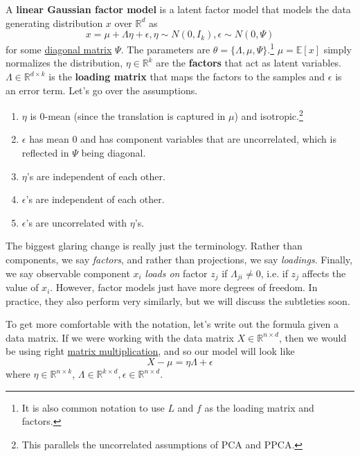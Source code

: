   \begin{definition}
    \label{def:linear-gaussian-factor-model}
 
    A \textbf{linear Gaussian factor model} is a latent factor model that models the data generating distribution $x$ over $\mathbb{R}^d$ as 
    \begin{equation}
      x = \mu + \Lambda \eta + \epsilon, \eta \sim N(0, I_k), \epsilon \sim N(0, \Psi)
    \end{equation}
    for some \hyperref[lin-def:diagonal-matrix]{diagonal matrix} $\Psi$. The parameters are $\theta = \{\Lambda, \mu, \Psi\}$.\footnote{It is also common notation to use $L$ and $f$ as the loading matrix and factors.} $\mu = \mathbb{E}[x]$ simply normalizes the distribution, $\eta \in \mathbb{R}^k$ are the \textbf{factors} that act as latent variables. $\Lambda \in \mathbb{R}^{d \times k}$ is the \textbf{loading matrix} that maps the factors to the samples and $\epsilon$ is an error term. 
    Let's go over the assumptions. 
    \begin{enumerate}
      \item  $\eta$ is $0$-mean (since the translation is captured in $\mu$) and isotropic.\footnote{This parallels the uncorrelated assumptions of PCA and PPCA.}
      \item $\epsilon$ has mean $0$ and has component variables that are uncorrelated, which is reflected in $\Psi$ being diagonal.
      \item $\eta$'s are independent of each other. 
      \item $\epsilon$'s are independent of each other. 
      \item $\epsilon$'s are uncorrelated with $\eta$'s. 
    \end{enumerate}
  \end{definition} 

  The biggest glaring change is really just the terminology. Rather than components, we say \textit{factors}, and rather than projections, we say \textit{loadings}. Finally, we say observable component $x_i$ \textit{loads on} factor $z_j$ if $\Lambda_{ji} \neq 0$, i.e. if $z_j$ affects the value of $x_i$. However, factor models just have more degrees of freedom. In practice, they also perform very similarly, but we will discuss the subtleties soon. 

  To get more comfortable with the notation, let's write out the formula given a data matrix. If we were working with the data matrix $X \in \mathbb{R}^{n \times d}$, then we would be using right \hyperref[lin-def:matrix-multiplication]{matrix multiplication}, and so our model will look like 
  \begin{equation}
    X - \mu = \eta \Lambda + \epsilon
  \end{equation}
  where $\eta \in \mathbb{R}^{n \times k}$, $\Lambda \in \mathbb{R}^{k \times d}, \epsilon \in \mathbb{R}^{n \times d}$. 


